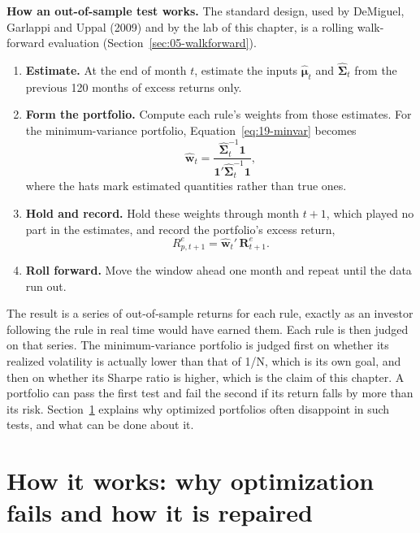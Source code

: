 \textbf{How an out-of-sample test works.} The standard design, used by DeMiguel, Garlappi and Uppal (2009) and by the lab of this chapter, is a rolling walk-forward evaluation (Section~\ref{sec:05-walkforward}).
\begin{enumerate}
  \item \textbf{Estimate.} At the end of month $t$, estimate the inputs $\hat{\boldsymbol{\mu}}_t$ and $\hat{\boldsymbol{\Sigma}}_t$ from the previous 120 months of excess returns only.
  \item \textbf{Form the portfolio.} Compute each rule's weights from those estimates. For the minimum-variance portfolio, Equation~\eqref{eq:19-minvar} becomes
  \begin{equation}
    \hat{\mathbf{w}}_t = \frac{\hat{\boldsymbol{\Sigma}}_t^{-1}\mathbf{1}}{\mathbf{1}'\hat{\boldsymbol{\Sigma}}_t^{-1}\mathbf{1}},
    \label{eq:19-minvar-hat}
  \end{equation}
  where the hats mark estimated quantities rather than true ones.
  \item \textbf{Hold and record.} Hold these weights through month $t+1$, which played no part in the estimates, and record the portfolio's excess return,
  \begin{equation}
    R^{e}_{p,t+1} = \hat{\mathbf{w}}_t'\,\mathbf{R}^{e}_{t+1}.
    \label{eq:19-oos-return}
  \end{equation}
  \item \textbf{Roll forward.} Move the window ahead one month and repeat until the data run out.
\end{enumerate}
The result is a series of out-of-sample returns for each rule, exactly as an investor following the rule in real time would have earned them. Each rule is then judged on that series. The minimum-variance portfolio is judged first on whether its realized volatility is actually lower than that of 1/N, which is its own goal, and then on whether its Sharpe ratio is higher, which is the claim of this chapter. A portfolio can pass the first test and fail the second if its return falls by more than its risk. Section~\ref{sec:19-how} explains why optimized portfolios often disappoint in such tests, and what can be done about it.

\section{How it works: why optimization fails and how it is repaired}
\label{sec:19-how}

